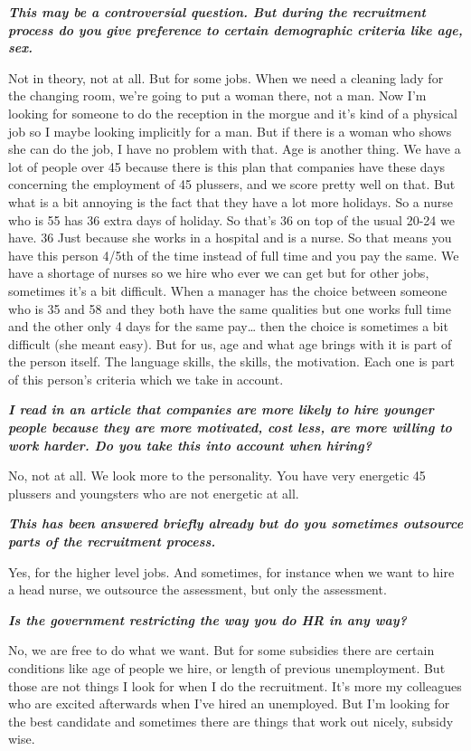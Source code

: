 \documentclass[a4paper,fleqn,11pt,dvips,titlepage]{article}
\newcommand{\question}[1]{\textbf{\textit{#1}}}
\numberwithin{figure}{section}
\numberwithin{equation}{section}
\begin{document}
\question{This may be a controversial question. But during the recruitment process do you give preference to certain demographic criteria like age, sex.}

Not in theory, not at all. But for some jobs. When we need a cleaning lady for the changing room, we’re going to put a woman there, not a man. Now I’m looking for someone to do the reception in the morgue and it’s kind of a physical job so I maybe looking implicitly for a man. But if there is a woman who shows she can do the job, I have no problem with that. Age is another thing. We have a lot of people over 45 because there is this plan that companies have these days concerning the employment of 45 plussers, and we score pretty well on that. But what is a bit annoying is the fact that they have a lot more holidays. So a nurse who is 55 has 36 extra days of holiday. So that’s 36 on top of the usual 20-24 we have. 36 Just because she works in a hospital and is a nurse. So that means you have this person 4/5th of the time instead of full time and you pay the same. We have a shortage of nurses so we hire who ever we can get but for other jobs, sometimes it’s a bit difficult. When a manager has the choice between someone who is 35 and 58 and they both have the same qualities but one works full time and the other only 4 days for the same pay… then the choice is sometimes a bit difficult (she meant easy). But for us, age and what age brings with it is part of the person itself. The language skills, the skills, the motivation. Each one is part of this person’s criteria which we take in account. 

\question{I read in an article that companies are more likely to hire younger people because they are more motivated, cost less, are more willing to work harder. Do you take this into account when hiring?}

No, not at all. We look more to the personality. You have very energetic 45 plussers and youngsters who are not energetic at all. 

\question{This has been answered briefly already but do you sometimes outsource parts of the recruitment process. }

Yes, for the higher level jobs. And sometimes, for instance when we want to hire a head nurse, we outsource the assessment, but only the assessment. 

\question{Is the government restricting the way you do HR in any way?}

No, we are free to do what we want. But for some subsidies there are certain conditions like age of people we hire, or length of previous unemployment. But those are not things I look for when I do the recruitment. It’s more my colleagues who are excited afterwards when I’ve hired an unemployed. But I’m looking for the best candidate and sometimes there are things that work out nicely, subsidy wise. 
\end{document}
